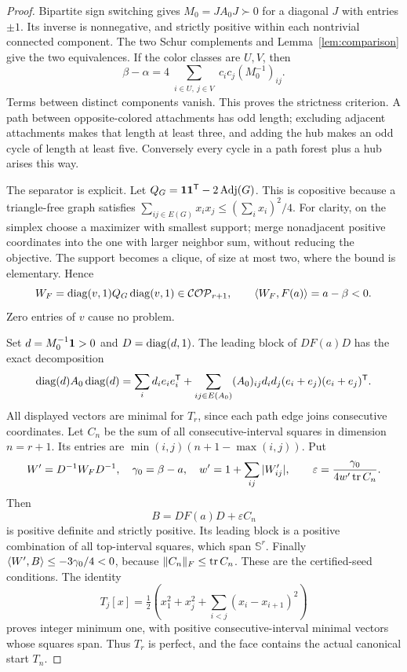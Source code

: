 \begin{proof}
Bipartite sign switching gives $M_0=JA_0J\succ0$ for a diagonal $J$ with entries $\pm1$. Its inverse is nonnegative, and strictly positive within each nontrivial connected component. The two Schur complements and Lemma~\ref{lem:comparison} give the two equivalences. If the color classes are $U,V$, then
\[
 \beta-\alpha
 =4\sum_{\substack{i\in U,\ j\in V}}c_ic_j(M_0^{-1})_{ij}.
\]
Terms between distinct components vanish. This proves the strictness criterion. A path between opposite-colored attachments has odd length; excluding adjacent attachments makes that length at least three, and adding the hub makes an odd cycle of length at least five. Conversely every cycle in a path forest plus a hub arises this way.

The separator is explicit. Let $Q_G={\bf1}{\bf1}^{\mathsf T}-2\operatorname{Adj}(G)$. This is copositive because a triangle-free graph satisfies
$\sum_{ij\in E(G)}x_ix_j\le(\sum_i x_i)^2/4$. For clarity, on the simplex choose a maximizer with smallest support; merge nonadjacent positive coordinates into the one with larger neighbor sum, without reducing the objective. The support becomes a clique, of size at most two, where the bound is elementary. Hence
\[
 W_F=\operatorname{diag}(v,1)Q_G\operatorname{diag}(v,1)\in\mathcal{COP}_{r+1},\qquad
 \langle W_F,F(a)\rangle=a-\beta<0.
\]
Zero entries of $v$ cause no problem.

Set $d=M_0^{-1}{\bf1}>0$ and $D=\operatorname{diag}(d,1)$. The leading block of $DF(a)D$ has the exact decomposition
\[
 \operatorname{diag}(d)A_0\operatorname{diag}(d)
 =\sum_i d_i e_ie_i^{\mathsf T}
 +\sum_{ij\in E(A_0)}(A_0)_{ij}d_id_j(e_i+e_j)(e_i+e_j)^{\mathsf T}.
\]
All displayed vectors are minimal for $T_r$, since each path edge joins consecutive coordinates. Let $C_n$ be the sum of all consecutive-interval squares in dimension $n=r+1$. Its entries are $\min(i,j)(n+1-\max(i,j))$. Put
\[
 W'=D^{-1}W_FD^{-1},\quad \gamma_0=\beta-a,\quad
 w'=1+\sum_{ij}|W'_{ij}|,\qquad
 \varepsilon=\frac{\gamma_0}{4w'\operatorname{tr} C_n}.
\]
Then
\[
 B=DF(a)D+\varepsilon C_n
\]
is positive definite and strictly positive. Its leading block is a positive combination of all top-interval squares, which span $\mathbb S^r$. Finally
$\langle W',B\rangle\le-3\gamma_0/4<0$, because $\lVert C_n\rVert_F\le\operatorname{tr} C_n$. These are the certified-seed conditions. The identity
\[
 T_j[x]=\tfrac12\left(x_1^2+x_j^2+\sum_{i<j}(x_i-x_{i+1})^2\right)
\]
proves integer minimum one, with positive consecutive-interval minimal vectors whose squares span. Thus $T_r$ is perfect, and the face contains the actual canonical start $T_n$.
\end{proof}

